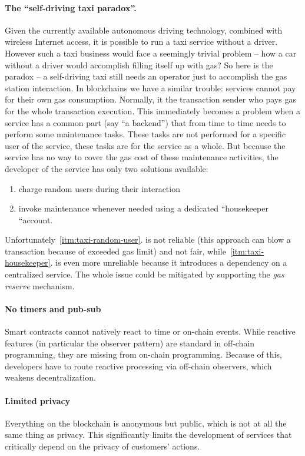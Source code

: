 \documentclass[a4paper]{article}
\begin{document}
\paragraph{The ``self-driving taxi paradox''.} Given the currently available autonomous driving technology, combined with wireless Internet access, it is possible to run a taxi service without a driver. However such a taxi business would face a seemingly trivial problem -- how a car without a driver would accomplish filling itself up with gas? So here is the paradox -- a self-driving taxi still needs an operator just to accomplish the gas station interaction. In blockchains we have a similar trouble: services cannot pay for their own gas consumption. Normally, it the transaction sender who pays gas for the whole transaction execution. This immediately becomes a problem when a service has a common part (say ``a backend'') that from time to time needs to perform some maintenance tasks. These tasks are not performed for a specific user of the service, these tasks are for the service as a whole. But because the service has no way to cover the gas cost of these maintenance activities, the developer of the service has only two solutions available:
\begin{enumerate}
  \item\label{itm:taxi-random-user} charge random users during their interaction
  \item\label{itm:taxi-housekeeper} invoke maintenance whenever needed using a dedicated “housekeeper “account.
\end{enumerate}
Unfortunately~\ref*{itm:taxi-random-user}. is not reliable (this approach can blow a transaction because of exceeded gas limit) and not fair, while~\ref*{itm:taxi-housekeeper}. is even more unreliable because it introduces a dependency on a centralized service. The whole issue could be mitigated by supporting the \emph{gas reserve} mechanism.
\paragraph{No timers and pub-sub} Smart contracts cannot natively react to time or on-chain events. While reactive features (in particular the observer pattern) are standard in off-chain programming, they are missing from on-chain programming. Because of this, developers have to route reactive processing via off-chain observers, which weakens decentralization.
\paragraph{Limited privacy} Everything on the blockchain is anonymous but public, which is not at all the same thing as privacy. This significantly limits the development of services that critically depend on the privacy of customers’ actions.
\end{document}
